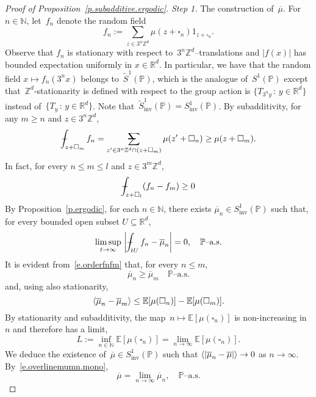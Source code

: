 \documentclass[11pt]{article} %
\makeatletter
\let\oldsquare\square %
\renewcommand{\square}{\oldsquare}
\numberwithin{equation}{section}
\theoremstyle{definition}
\let\originalleft\left
\let\originalright\right
\renewcommand{\left}{\mathopen{}\mathclose\bgroup\originalleft}
\renewcommand{\right}{\aftergroup\egroup\originalright}
\newcommand*{\N}{\ensuremath{\mathbb{N}}}
\newcommand*{\Zd}{\ensuremath{\mathbb{Z}^d}}
\newcommand*{\Rd}{\ensuremath{\mathbb{R}^d}}
\renewcommand*{\tilde}{\widetilde}
\newcommand{\inv}{\mathrm{inv}}
\newcommand{\cu}{\square}
\renewcommand{\P}{\mathbb{P}}
\newcommand{\E}{\mathbb{E}}
\newcommand{\indc}{1}
\newcommand{\avsum}{\mathop{\mathpalette\avsuminner\relax}\displaylimits}
\newcommand\avsuminner[2]{%
  {\sbox0{$\m@th#1\sum$}%
   \vphantom{\usebox0}%
   \ooalign{%
     \hidewidth
     \smash{\,\rule[.23em]{8.8pt}{1.1pt} \relax}%
     \hidewidth\cr
     $\m@th#1\sum$\cr
   }%
  }%
}
\def\Xint#1{\mathchoice
{\XXint\displaystyle\textstyle{#1}}%
{\XXint\textstyle\scriptstyle{#1}}%
{\XXint\scriptstyle\scriptscriptstyle{#1}}%
{\XXint\scriptscriptstyle\scriptscriptstyle{#1}}%
\!\int}
\def\XXint#1#2#3{{\setbox0=\hbox{$#1{#2#3}{\int}$}
\vcenter{\hbox{$#2#3$}}\kern-.5\wd0}}
\def\fint{\Xint-}
\makeatother
\begin{document}
\begin{proof}[{Proof of Proposition~\ref{p.subadditive.ergodic}}]
\emph{Step 1.} 
The construction of~$\overline{\mu}$.
For~$n\in\N$, let~$f_n$ denote the random field 
\begin{equation*}
f_n:= \sum_{z\in 3^n\Zd} \mu(z+\cu_n)  \indc_{z+\cu_n}.
\end{equation*}
Observe that $f_n$ is stationary with respect to~$3^n\Zd$--translations and $|f(x)|$ has bounded expectation uniformly in $x\in\Rd$. In particular, we have that the random field $x\mapsto f_n(3^{n}x)$ belongs to~$\tilde{S}^1(\P)$, which is the analogue of~$S^1(\P)$ except that~$\Zd$-stationarity is defined with respect to the group action is $\{ T_{3^n y} \,:\, y\in\Rd\}$ instead of~$\{ T_y \,:\, y\in\Rd\}$. Note that~$\tilde{S}^1_{\mathrm{inv}}(\P)=S^1_{\mathrm{inv}}(\P)$.
By  subadditivity, for any $m\geq n$ and $z\in 3^n\Zd$, 
\begin{align}
\label{e.subbaddtof}
\fint_{z+\cu_m} f_n
= \avsum_{z' \in 3^n\Zd \cap (z+\cu_m)} 
\mu(z'+\cu_n)
\geq 
\mu(z+\cu_m).
\end{align}
In fact, for every $n\leq m \leq l$ and $z\in 3^m\Zd$, 
\begin{align}
\label{e.orderfnfm}
\fint_{z+\cu_l} ( f_n - f_m )
\geq 
0
\end{align}
By Proposition~\ref{p.ergodic}, for each $n\in\N$, there exists $\overline{\mu}_n\in S^1_\inv(\P)$ such that, for every bounded open subset $U\subseteq \Rd$, 
\begin{equation}
\label{e.fnconvergemun}
\limsup_{t\to \infty} \
\left|\fint_{tU} f_n- \overline{\mu}_n \right| 
=0,
\quad\mbox{$\P$--a.s.}
\end{equation}
It is evident from~\eqref{e.orderfnfm} that, for every $n\leq m$, 
\begin{equation}
\label{e.overlinemumn.mono}
\overline{\mu}_n
\geq 
\overline{\mu}_m 
\quad \mbox{$\P$--a.s.}
\end{equation}
and, using also stationarity, 
\begin{equation*}
\langle \overline{\mu}_n - \overline{\mu}_m \rangle
\leq 
\E \left[ \mu(\cu_n) \right] 
-
\E \left[ \mu(\cu_m) \right].
\end{equation*}
By stationarity and subadditivity, the map~$n\mapsto \E[\mu(\cu_n)]$ is non-increasing in $n$ and therefore has a limit,
\begin{equation}
\label{e.LEcunlim}
L:= \inf_{n\in\N} \E[\mu(\cu_n)] = \lim_{n\to \infty} \E[\mu(\cu_n)]. 
\end{equation}
We deduce the existence of~$\overline{\mu} \in S^1_\inv(\P)$ such that $\langle \left| \overline{\mu}_n - \overline{\mu} \right| \rangle \to 0$ as $n \to \infty$. By~\eqref{e.overlinemumn.mono},
\begin{equation}
\label{e.overlinemulim}
\overline{\mu} = \lim_{n\to \infty} \overline{\mu}_n, \quad \mbox{$\P$--a.s.}
\end{equation}


\end{proof}
\end{document}

